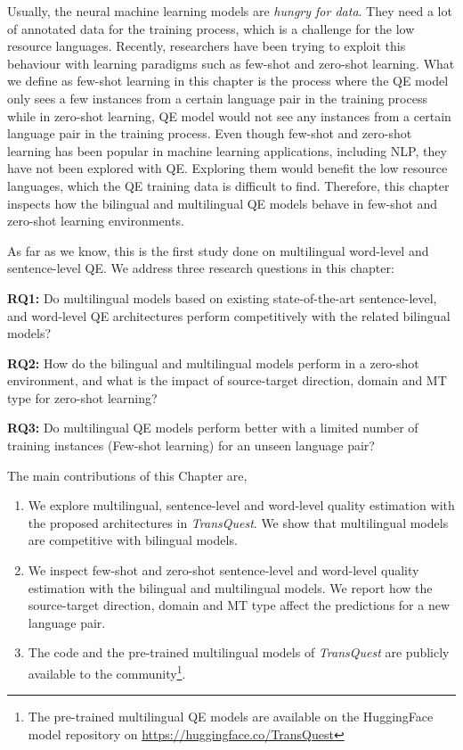 Usually, the neural machine learning models are \textit{hungry for data}. They need a lot of annotated data for the training process, which is a challenge for the low resource languages. Recently, researchers have been trying to exploit this behaviour with learning paradigms such as few-shot and zero-shot learning.  What we define as few-shot learning in this chapter is the process where the QE model only sees a few instances from a certain language pair in the training process \autocite{10.1145/3386252} while in zero-shot learning, QE model would not see any instances from a certain language pair \autocite{10.5555/1620163.1620201} in the training process. Even though few-shot and zero-shot learning has been popular in machine learning applications, including NLP, they have not been explored with QE. Exploring them would benefit the low resource languages, which the QE training data is difficult to find. Therefore, this chapter inspects how the bilingual and multilingual QE models behave in few-shot and zero-shot learning environments.


As far as we know, this is the first study done on multilingual word-level and sentence-level QE. We address three research questions in this chapter:

\textbf{RQ1:} Do multilingual models based on existing state-of-the-art sentence-level, and word-level QE architectures perform competitively with the related bilingual models?

\textbf{RQ2:} How do the bilingual and multilingual models perform in a zero-shot environment, and what is the impact of source-target direction, domain and MT type for zero-shot learning?

\textbf{RQ3:} Do multilingual QE models perform better with a limited number of training instances (Few-shot learning) for an unseen language pair?


The main contributions of this Chapter are, 

\begin{enumerate}

\item We explore multilingual, sentence-level and word-level quality estimation with the proposed architectures in \textit{TransQuest}. We show that multilingual models are competitive with bilingual models.

\item We inspect few-shot and zero-shot sentence-level and word-level quality estimation with the bilingual and multilingual models. We report how the source-target direction, domain and MT type affect the predictions for a new language pair.

\item The code and the pre-trained multilingual models of \textit{TransQuest} are publicly available to the community\footnote{The pre-trained multilingual QE models are available on the HuggingFace model repository on \url{https://huggingface.co/TransQuest}}.

\end{enumerate} 

